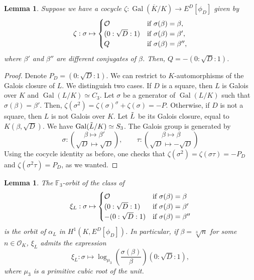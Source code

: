 \documentclass[oneside]{amsart}
\newcommand{\embrace}[3]{\left#1 #3 \right#2}
\newcommand{\lpar}[1]{\embrace{(}{)}{#1}}
\DeclareMathOperator{\gal}{Gal}
\newtheorem{lemma}[X]{Lemma}
\theoremstyle{definition}
\begin{document}
\begin{lemma}
    \label{lemma: Third point}
    Suppose we have a cocycle $\zeta: \gal(\overline{K}/K) \to E^{D}[\phi_D]$ given by 
    $$
    \zeta:\sigma\mapsto 
    \begin{cases}
        \mathcal{O} &\textnormal{if }\sigma(\beta) = \beta,\\
        (0:\sqrt{D}:1) &\textnormal{if }\sigma(\beta) = \beta',\\
        Q&\textnormal{if }\sigma(\beta) = \beta'',
    \end{cases}
    $$
    where $\beta'$ and $\beta''$ are different conjugates of $\beta$. Then, $Q = -(0:\sqrt{D}:1)$.
\end{lemma}
\begin{proof}
    Denote $P_D = (0:\sqrt{D}:1)$. We can restrict to $K$-automorphisms of the Galois closure of $L$. We distinguish two cases.  If $D$ is a square, then $L$ is Galois over $K$ and $\gal(L/K) \simeq C_3$. Let $\sigma$ be a generator of $\gal(L/K)$ such that $\sigma(\beta) = \beta'$. Then, $\zeta(\sigma^2) = \zeta(\sigma)^{\sigma} + \zeta(\sigma) = -P$. Otherwise, if $D$ is not a square, then $L$ is not Galois over $K$. Let $\Tilde{L}$ be its Galois closure, equal to $K(\beta, \sqrt{D})$. We have $\gal(\Tilde{L}/K) \simeq S_3$. The Galois group is generated by
    \begin{equation}
        \label{equation: Galois generators}
        \sigma:\binom{\beta\mapsto\beta'}{\sqrt{D}\mapsto \sqrt{D}}, \qquad
        \tau: \binom{\beta\mapsto\beta}{\sqrt{D}\mapsto -\sqrt{D}}
    \end{equation}
    Using the cocycle identity as before, one checks that $\zeta(\sigma^2) = \zeta(\sigma\tau) = -P_D$ and $\zeta(\sigma^2\tau) = P_D$, as we wanted. 
\end{proof}
\begin{lemma}
    \label{lemma: cocycle cubic field}
    The $\mathbb{F}_3$-orbit of the class of
    $$
    \xi_L:\sigma \mapsto 
    \begin{cases}
        \mathcal{O}&\textnormal{if }\sigma(\beta) = \beta\\
        (0:\sqrt{D}:1)&\textnormal{if }\sigma(\beta) = \beta'\\
        -(0:\sqrt{D}:1)&\textnormal{if }\sigma(\beta) = \beta''\\
    \end{cases}
    $$
    is the orbit of $\alpha_L$ in $H^1(K,E^D[\phi_D])$. In particular, if $\beta = \sqrt[3]{n}$ for some $n \in \mathcal{O}_K$, $\xi_L$ admits the expression
    $$
    \xi_L: \sigma \mapsto \log_{\mu_3}\lpar{\frac{\sigma(\beta)}{\beta}}(0:\sqrt{D}:1),
    $$
    where $\mu_3$ is a primitive cubic root of the unit.
\end{lemma}
\end{document}
